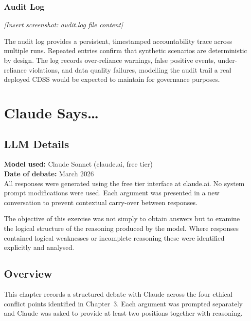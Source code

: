 \documentclass[]{UCD_CS_41820_Report}
\begin{document}
\subsection*{Audit Log}

\noindent\textit{[Insert screenshot: audit.log file content]}

The audit log provides a persistent, timestamped accountability trace across
multiple runs. Repeated entries confirm that synthetic scenarios are deterministic
by design. The log records over-reliance warnings, false positive events,
under-reliance violations, and data quality failures, modelling the audit trail
a real deployed CDSS would be expected to maintain for governance purposes.

\chapter{Claude Says\ldots}

\section*{LLM Details}

\textbf{Model used:} Claude Sonnet (claude.ai, free tier)\\
\textbf{Date of debate:} March 2026\\

All responses were generated using the free tier interface at claude.ai. No system
prompt modifications were used. Each argument was presented in a new conversation
to prevent contextual carry-over between responses.

The objective of this exercise was not simply to obtain answers but to examine the
logical structure of the reasoning produced by the model. Where responses contained
logical weaknesses or incomplete reasoning these were identified explicitly and
analysed.

\section*{Overview}

This chapter records a structured debate with Claude across the four ethical conflict
points identified in Chapter~3. Each argument was prompted separately and Claude was
asked to provide at least two positions together with reasoning.
\end{document}
